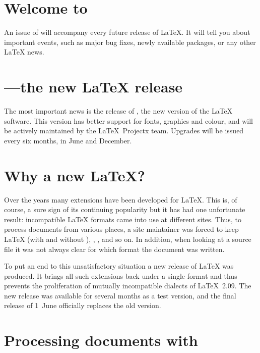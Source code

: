 \documentclass{ltnews}
\begin{document}
\maketitle

\section{Welcome to \LaTeXNews}

An issue of \emph{\LaTeXNews} will accompany every future release of
\LaTeX.  It will tell you about important events, such as major bug
fixes, newly available packages, or any other \LaTeX{} news.

\section{\LaTeXe---the new \LaTeX{} release}

The most important news is the release of \LaTeXe, the new version of
the \LaTeX{} software.  This version has better support for fonts,
graphics and colour, and will be actively maintained by the \LaTeX\
Projectx team.  Upgrades will be issued every six months, in June and
December.

\section{Why a new \LaTeX?}

Over the years many extensions have been developed for \LaTeX. This
is, of course, a sure sign of its continuing popularity but it has had
one unfortunate result: incompatible \LaTeX{} formats came into use at
different sites. Thus, to process documents from various places, a
site maintainer was forced to keep \LaTeX{} (with and without \NFSS),
\SLiTeX, \AmSLaTeX, and so on.  In addition, when looking at a source
file it was not always clear for which format the document was written.

To put an end to this unsatisfactory
situation a new release of \LaTeX{} was produced.
It brings all such extensions back under a single format and thus
prevents the proliferation of mutually incompatible dialects of
\LaTeX~2.09. The new release was available for several months as a
test version, and the final release of 1~June officially
replaces the old version.

\section{Processing documents with \LaTeXe}
\end{document}
